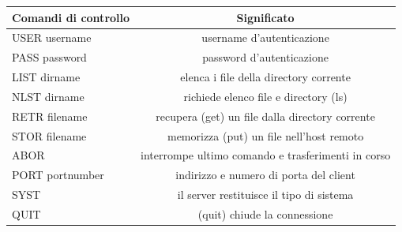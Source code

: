 \documentclass[11pt,a4paper,oneside]{book}
\theoremstyle{definition}
\begin{document}
\begin{table}[h!]
	\begin{center}
		\label{tab:table1}
		\begin{tabular}{l|c}
			\textbf{Comandi di controllo} & \textbf{Significato}             \\
			\hline
			USER   username               & username d'autenticazione        \\
			PASS   password               & password   d'autenticazione      \\
			LIST   dirname                & elenca i file della
			directory corrente                                               \\
			NLST   dirname                & richiede elenco file e
			directory (ls)                                                   \\
			RETR   filename               & recupera (get)
			un file dalla directory
			corrente                                                         \\
			STOR   filename               & memorizza
			(put) un file nell’host remoto                                   \\
			ABOR                          & interrompe ultimo
			comando e trasferimenti in
			corso                                                            \\
			PORT   portnumber             & indirizzo e numero di porta
			del client                                                       \\
			SYST                          & il server restituisce il tipo di
			sistema                                                          \\
			QUIT                          & (quit) chiude la
			connessione                                                      \\
		\end{tabular}
	\end{center}
\end{table}

\pagebreak
\end{document}
